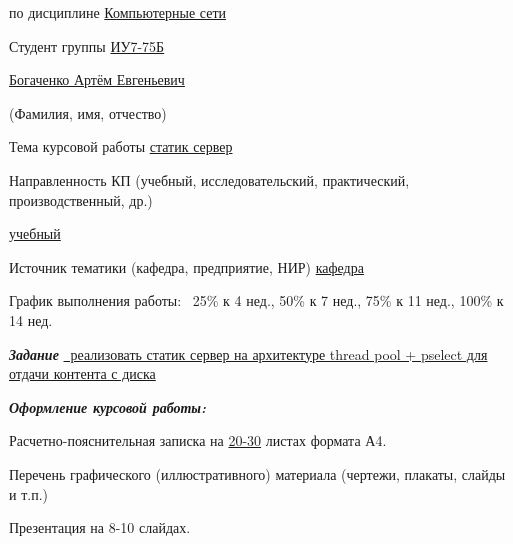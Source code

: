 \begin{flushleft}
	\fontsize{12pt}{0.6cm}\selectfont
	
	по дисциплине \uline{\hfill Компьютерные сети\hfill}
	
	Студент группы \uline{ИУ7-75Б}
	
	\centerline{\uline{\hfill Богаченко Артём Евгеньевич \hfill}}
	\scriptsize\mbox{\hspace{7cm}}(Фамилия, имя, отчество)
	
	\fontsize{12pt}{0.6cm}\selectfont
	
	\fontsize{12pt}{0.5\baselineskip}\selectfont
	Тема курсовой работы {\uline{\hfill статик сервер\hfill}}
	
	
	Направленность КП (учебный, исследовательский, практический, производственный, др.)\hfill\centerline{\uline{\hfill учебный \hfill}}
	
	Источник тематики (кафедра, предприятие, НИР) {\uline{\hfill кафедра \hfill}}
	
	\fontsize{12pt}{0.6\baselineskip}\selectfont
	График выполнения работы: ~25\% к 4 нед., 50\% к 7 нед., 75\% к 11 нед., 100\% к 14 нед.
	
	\addvspace{8pt}
	\fontsize{12pt}{0.5\baselineskip}\selectfont
	\textit{\bfseries{Задание}} 
	\uline{~реализовать статик сервер на архитектуре thread pool + pselect для отдачи контента с диска\hfill}
	
	\addvspace{6pt}
	
	\textit{\bfseries{Оформление курсовой работы:}}
	
	\fontsize{12pt}{0.1cm}\selectfont
	Расчетно-пояснительная записка на \uline{20-30} листах формата А4.
	
	Перечень графического (иллюстративного) материала (чертежи, плакаты, слайды и т.п.)
	
	Презентация на 8-10 слайдах.
\end{flushleft}

\vspace*{-0.3cm}

